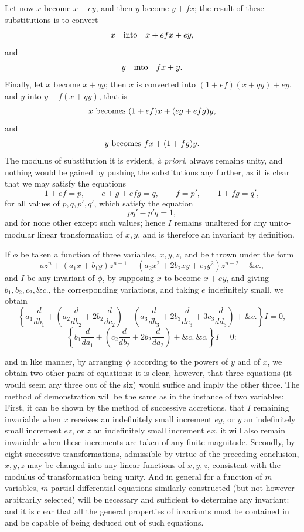 \documentclass[11pt]{article}
\newcommand{\sourcepage}[1]{\marginpar{\scriptsize p.~#1}}
\begin{document}
Let now $x$ become $x+ey$, and then $y$ become $y+fx$; the result of these substitutions is to convert
\[
x\quad\hbox{into}\quad x+efx+ey,
\]
and
\[
y\quad\hbox{into}\quad fx+y.
\]
Finally, let $x$ become $x+qy$; then $x$ is converted into $(1+ef)(x+qy)+ey$, and $y$ into $y+f(x+qy)$, that is
\[
x\hbox{ becomes }(1+ef)x+(eg+efg)y,
\]
and
\[
y\hbox{ becomes }fx+(1+fg)y.
\]
The modulus of substitution it is evident, \emph{à priori}, always remains unity, and nothing would be gained by pushing the substitutions any further, as it is clear that we may satisfy the equations
\[
1+ef=p,
\qquad e+g+efg=q,
\qquad f=p',
\qquad 1+fg=q',
\]
for all values of $p,q,p',q'$, which satisfy the equation
\[
pq'-p'q=1,
\]
and for none other except such values; hence $I$ remains unaltered for any unito-modular linear transformation of $x,y$, and is therefore an invariant by definition.

If $\phi$ be taken a function of three variables, $x,y,z$, and be thrown under the form
\[
az^n+(a_1x+b_1y)z^{n-1}+(a_2x^2+2b_2xy+c_2y^2)z^{n-2}+\&c.,
\]
and $I$ be any invariant of $\phi$, by supposing $x$ to become $x+ey$, and giving $b_1,b_2,c_2,\&c.$, the corresponding variations, and taking $e$ indefinitely small, we obtain
\[
\left\{a_1\frac{d}{db_1}+\left(a_2\frac{d}{db_2}+2b_2\frac{d}{dc_2}\right)
+\left(a_3\frac{d}{db_3}+2b_3\frac{d}{dc_3}+3c_3\frac{d}{dd_3}\right)+\&c.\right\}I=0,
\]
\[
\left\{b_1\frac{d}{da_1}+\left(c_2\frac{d}{db_2}+2b_2\frac{d}{da_2}\right)+\&c.\ \&c.\right\}I=0:
\]

\sourcepage{356}
and in like manner, by arranging $\phi$ according to the powers of $y$ and of $x$, we obtain two other pairs of equations: it is clear, however, that three equations (it would seem any three out of the six) would suffice and imply the other three. The method of demonstration will be the same as in the instance of two variables: First, it can be shown by the method of successive accretions, that $I$ remaining invariable when $x$ receives an indefinitely small increment $ey$, or $y$ an indefinitely small increment $ez$, or $z$ an indefinitely small increment $ex$, it will also remain invariable when these increments are taken of any finite magnitude. Secondly, by eight successive transformations, admissible by virtue of the preceding conclusion, $x,y,z$ may be changed into any linear functions of $x,y,z$, consistent with the modulus of transformation being unity. And in general for a function of $m$ variables, $m$ partial differential equations similarly constructed (but not however arbitrarily selected) will be necessary and sufficient to determine any invariant: and it is clear that all the general properties of invariants must be contained in and be capable of being deduced out of such equations.
\end{document}
